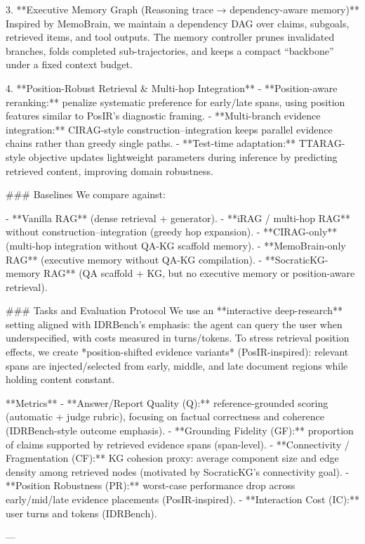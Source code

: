 3. **Executive Memory Graph (Reasoning trace → dependency-aware memory)**  
   Inspired by MemoBrain, we maintain a dependency DAG over claims, subgoals, retrieved items, and tool outputs. The memory controller prunes invalidated branches, folds completed sub-trajectories, and keeps a compact “backbone” under a fixed context budget.

4. **Position-Robust Retrieval & Multi-hop Integration**  
   - **Position-aware reranking:** penalize systematic preference for early/late spans, using position features similar to PosIR’s diagnostic framing.  
   - **Multi-branch evidence integration:** CIRAG-style construction–integration keeps parallel evidence chains rather than greedy single paths.  
   - **Test-time adaptation:** TTARAG-style objective updates lightweight parameters during inference by predicting retrieved content, improving domain robustness.

### Baselines  
We compare against:

- **Vanilla RAG** (dense retrieval + generator).  
- **iRAG / multi-hop RAG** without construction–integration (greedy hop expansion).  
- **CIRAG-only** (multi-hop integration without QA-KG scaffold memory).  
- **MemoBrain-only RAG** (executive memory without QA-KG compilation).  
- **SocraticKG-memory RAG** (QA scaffold + KG, but no executive memory or position-aware retrieval).

### Tasks and Evaluation Protocol  
We use an **interactive deep-research** setting aligned with IDRBench’s emphasis: the agent can query the user when underspecified, with costs measured in turns/tokens. To stress retrieval position effects, we create *position-shifted evidence variants* (PosIR-inspired): relevant spans are injected/selected from early, middle, and late document regions while holding content constant.

**Metrics**  
- **Answer/Report Quality (Q):** reference-grounded scoring (automatic + judge rubric), focusing on factual correctness and coherence (IDRBench-style outcome emphasis).  
- **Grounding Fidelity (GF):** proportion of claims supported by retrieved evidence spans (span-level).  
- **Connectivity / Fragmentation (CF):** KG cohesion proxy: average component size and edge density among retrieved nodes (motivated by SocraticKG’s connectivity goal).  
- **Position Robustness (PR):** worst-case performance drop across early/mid/late evidence placements (PosIR-inspired).  
- **Interaction Cost (IC):** user turns and tokens (IDRBench).

---

